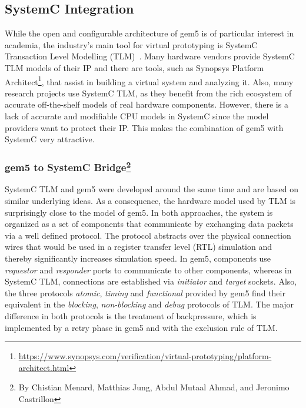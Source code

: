 \subsection[SystemC Integration]{SystemC Integration}
\label{sec:systemc}

While the open and configurable architecture of gem5 is of particular interest
in academia, the industry's main tool for virtual prototyping is SystemC
Transaction Level Modelling (TLM)~\cite{systemc_ieee11}. Many hardware vendors
provide SystemC TLM models of their IP and there are tools, such as Synopsys
Platform Architect\footnote{\url{https://www.synopsys.com/verification/virtual-prototyping/platform-architect.html}},
that assist in building a virtual system and analyzing it. Also, many research
projects use SystemC TLM, as they benefit from the rich ecosystem of accurate
off-the-shelf models of real hardware components. However, there is a lack of
accurate and modifiable CPU models in SystemC since the model providers want to
protect their IP. This makes the combination of gem5 with SystemC very
attractive.

\subsubsection[gem5 to SystemC Bridge]{gem5 to SystemC Bridge\footnote{By Chistian Menard, Matthias Jung, Abdul Mutaal Ahmad, and Jeronimo Castrillon}}

SystemC TLM and gem5 were developed around the same time and are based on
similar underlying ideas. As a consequence, the hardware model used by TLM is
surprisingly close to the model of gem5. In both approaches, the system is
organized as a set of components that communicate by exchanging data packets
via a well defined protocol. The protocol abstracts over the physical
connection wires that would be used in a register transfer level (RTL)
simulation and thereby significantly increases simulation speed. In gem5,
components use \emph{requestor} and \emph{responder} ports to communicate to other
components, whereas in SystemC TLM, connections are established via
\emph{initiator} and \emph{target} sockets. Also, the three protocols
\emph{atomic}, \emph{timing} and \emph{functional} provided by gem5 find their
equivalent in the \emph{blocking}, \emph{non-blocking} and \emph{debug}
protocols of TLM. The major difference in both protocols is the treatment of
backpressure, which is implemented by a retry phase in gem5 and with the
exclusion rule of TLM.

